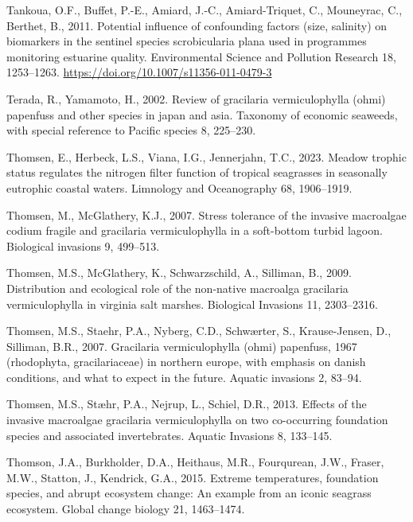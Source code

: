 \documentclass[
  letterpaper,
  11pt,
  english,
  singlespacing,
  headsepline]{MastersDoctoralThesis}
\newlength{\cslhangindent}
\newenvironment{CSLReferences}[2] %
 {\begin{list}{}{%
  \setlength{\itemindent}{0pt}
  \setlength{\leftmargin}{0pt}
  \setlength{\parsep}{0pt}
  \ifodd #1
   \setlength{\leftmargin}{\cslhangindent}
   \setlength{\itemindent}{-1\cslhangindent}
  \fi
  \setlength{\itemsep}{#2\baselineskip}}}
 {\end{list}}
\begin{document}
\begin{CSLReferences}{1}{0}
Tankoua, O.F., Buffet, P.-E., Amiard, J.-C., Amiard-Triquet, C.,
Mouneyrac, C., Berthet, B., 2011. Potential influence of confounding
factors (size, salinity) on biomarkers in the sentinel species
scrobicularia plana used in programmes monitoring estuarine quality.
Environmental Science and Pollution Research 18, 1253--1263.
\url{https://doi.org/10.1007/s11356-011-0479-3}

Terada, R., Yamamoto, H., 2002. Review of gracilaria vermiculophylla
(ohmi) papenfuss and other species in japan and asia. Taxonomy of
economic seaweeds, with special reference to Pacific species 8,
225--230.

Thomsen, E., Herbeck, L.S., Viana, I.G., Jennerjahn, T.C., 2023. Meadow
trophic status regulates the nitrogen filter function of tropical
seagrasses in seasonally eutrophic coastal waters. Limnology and
Oceanography 68, 1906--1919.

Thomsen, M., McGlathery, K.J., 2007. Stress tolerance of the invasive
macroalgae codium fragile and gracilaria vermiculophylla in a
soft-bottom turbid lagoon. Biological invasions 9, 499--513.

Thomsen, M.S., McGlathery, K., Schwarzschild, A., Silliman, B., 2009.
Distribution and ecological role of the non-native macroalga gracilaria
vermiculophylla in virginia salt marshes. Biological Invasions 11,
2303--2316.

Thomsen, M.S., Staehr, P.A., Nyberg, C.D., Schwærter, S., Krause-Jensen,
D., Silliman, B.R., 2007. Gracilaria vermiculophylla (ohmi) papenfuss,
1967 (rhodophyta, gracilariaceae) in northern europe, with emphasis on
danish conditions, and what to expect in the future. Aquatic invasions
2, 83--94.

Thomsen, M.S., Stæhr, P.A., Nejrup, L., Schiel, D.R., 2013. Effects of
the invasive macroalgae gracilaria vermiculophylla on two co-occurring
foundation species and associated invertebrates. Aquatic Invasions 8,
133--145.

Thomson, J.A., Burkholder, D.A., Heithaus, M.R., Fourqurean, J.W.,
Fraser, M.W., Statton, J., Kendrick, G.A., 2015. Extreme temperatures,
foundation species, and abrupt ecosystem change: An example from an
iconic seagrass ecosystem. Global change biology 21, 1463--1474.


\end{CSLReferences}
\end{document}
